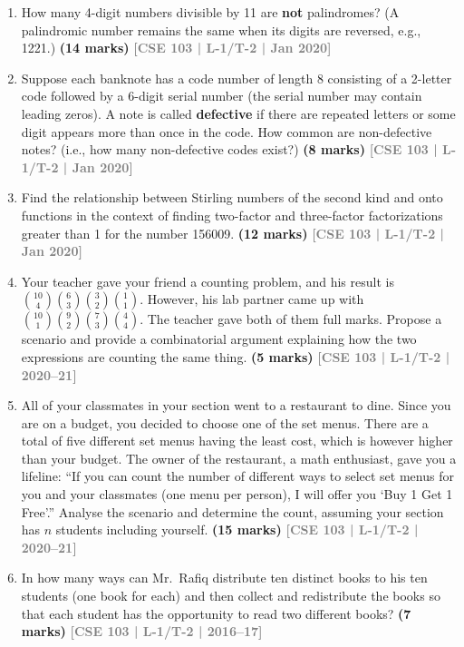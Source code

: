 \documentclass[12pt,a3paper]{article}
\newcommand{\yr}[1]{\hfill\textcolor{gray}{\small\textbf{[#1]}}}
\newcommand{\mk}[1]{\textcolor{orange!70!black}{\small\textbf{(#1 marks)}}}
\begin{document}
\begin{enumerate}
\item How many 4-digit numbers divisible by 11 are \textbf{not} palindromes? (A palindromic number remains the same when its digits are reversed, e.g., 1221.)
\mk{14} \yr{CSE 103 | L-1/T-2 | Jan 2020}

\item Suppose each banknote has a code number of length 8 consisting of a 2-letter code followed by a 6-digit serial number (the serial number may contain leading zeros). A note is called \textbf{defective} if there are repeated letters or some digit appears more than once in the code. How common are non-defective notes? (i.e., how many non-defective codes exist?)
\mk{8} \yr{CSE 103 | L-1/T-2 | Jan 2020}

\item Find the relationship between Stirling numbers of the second kind and onto functions in the context of finding two-factor and three-factor factorizations greater than 1 for the number 156009.
\mk{12} \yr{CSE 103 | L-1/T-2 | Jan 2020}

\item Your teacher gave your friend a counting problem, and his result is $\binom{10}{4}\binom{6}{3}\binom{3}{2}\binom{1}{1}$. However, his lab partner came up with $\binom{10}{1}\binom{9}{2}\binom{7}{3}\binom{4}{4}$. The teacher gave both of them full marks. Propose a scenario and provide a combinatorial argument explaining how the two expressions are counting the same thing.
\mk{5} \yr{CSE 103 | L-1/T-2 | 2020--21}

\item All of your classmates in your section went to a restaurant to dine. Since you are on a budget, you decided to choose one of the set menus. There are a total of five different set menus having the least cost, which is however higher than your budget. The owner of the restaurant, a math enthusiast, gave you a lifeline: ``If you can count the number of different ways to select set menus for you and your classmates (one menu per person), I will offer you `Buy 1 Get 1 Free'.'' Analyse the scenario and determine the count, assuming your section has $n$ students including yourself.
\mk{15} \yr{CSE 103 | L-1/T-2 | 2020--21}

\item In how many ways can Mr.\ Rafiq distribute ten distinct books to his ten students (one book for each) and then collect and redistribute the books so that each student has the opportunity to read two different books?
\mk{7} \yr{CSE 103 | L-1/T-2 | 2016--17}


\end{enumerate}
\end{document}

